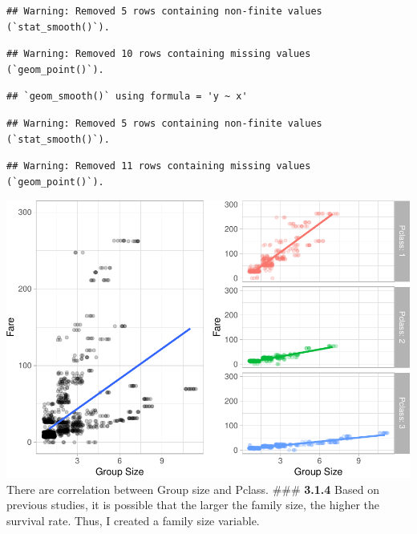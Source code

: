 \documentclass[
]{article}
\newenvironment{Shaded}{\begin{snugshade}}{\end{snugshade}}
\newcommand{\DecValTok}[1]{\textcolor[rgb]{0.00,0.00,0.81}{#1}}
\newcommand{\FunctionTok}[1]{\textcolor[rgb]{0.00,0.00,0.00}{#1}}
\newcommand{\NormalTok}[1]{#1}
\newcommand{\OtherTok}[1]{\textcolor[rgb]{0.56,0.35,0.01}{#1}}
\newcommand{\SpecialCharTok}[1]{\textcolor[rgb]{0.00,0.00,0.00}{#1}}
\begin{document}
\begin{verbatim}
## Warning: Removed 5 rows containing non-finite values (`stat_smooth()`).
\end{verbatim}

\begin{verbatim}
## Warning: Removed 10 rows containing missing values (`geom_point()`).
\end{verbatim}

\begin{verbatim}
## `geom_smooth()` using formula = 'y ~ x'
\end{verbatim}

\begin{verbatim}
## Warning: Removed 5 rows containing non-finite values (`stat_smooth()`).
\end{verbatim}

\begin{verbatim}
## Warning: Removed 11 rows containing missing values (`geom_point()`).
\end{verbatim}

\includegraphics{final_pdf_files/figure-latex/unnamed-chunk-31-1.pdf}
There are correlation between Group size and Pclass. \#\#\#
\textbf{3.1.4} Based on previous studies, it is possible that the larger
the family size, the higher the survival rate. Thus, I created a family
size variable.

\begin{Shaded}
\end{Shaded}
\end{document}
